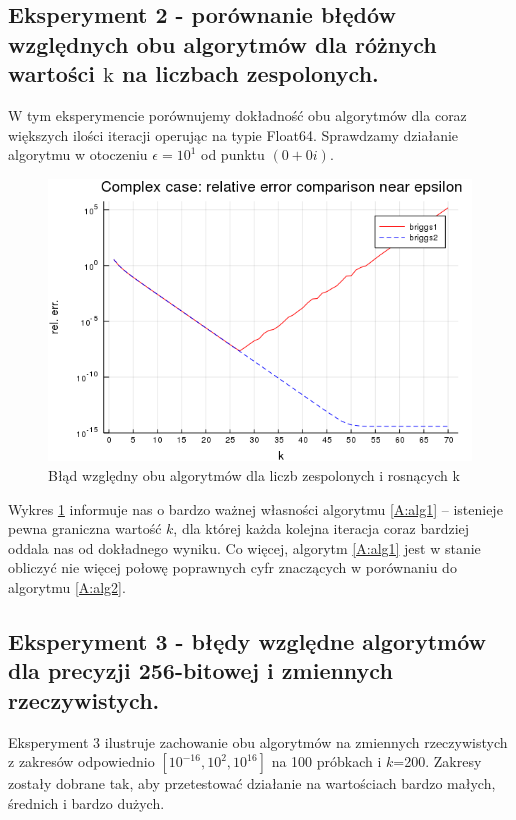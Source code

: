 \documentclass{article}
\begin{document}
	\subsection{Eksperyment 2 - porównanie błędów względnych obu algorytmów dla różnych wartości $\mathrm{k}$ na liczbach zespolonych.}
	W tym eksperymencie porównujemy dokładność obu algorytmów dla coraz większych ilości iteracji operując na typie Float64. Sprawdzamy działanie algorytmu w otoczeniu $\epsilon=10^1$ od punktu $(0+0i)$.
		\begin{figure}[h]
		\includegraphics[scale=0.6]{exp2.png}
		\caption{Błąd względny obu algorytmów dla liczb zespolonych i rosnących k}
		\label{fig:exp2}
		\end{figure}

Wykres \ref{fig:exp2} informuje nas o bardzo ważnej własności algorytmu \ref{A:alg1} -- istenieje pewna graniczna wartość $k$, dla której każda kolejna iteracja coraz bardziej oddala nas od dokładnego wyniku. Co więcej, algorytm \ref{A:alg1} jest w stanie obliczyć nie więcej połowę poprawnych cyfr znaczących w porównaniu do algorytmu \ref{A:alg2}.
	
\pagebreak
	\subsection{Eksperyment 3 - błędy względne algorytmów dla precyzji 256-bitowej i zmiennych rzeczywistych.}
	Eksperyment 3 ilustruje zachowanie obu algorytmów na zmiennych rzeczywistych z zakresów odpowiednio $[10^{-16},10^{2}, 10^16]$ na 100 próbkach i $k$=200. Zakresy zostały dobrane tak, aby przetestować działanie na wartościach bardzo małych, średnich i bardzo dużych. 
	
\end{document}
